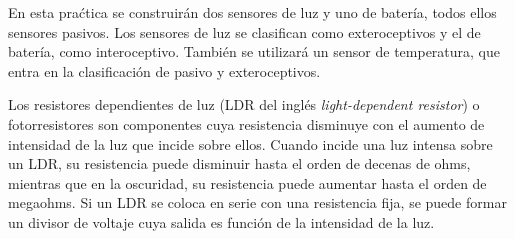 \documentclass[a4paper,12pt]{article}
\begin{document}
En esta praćtica se construirán dos sensores de luz y uno de batería, todos ellos sensores pasivos. Los sensores de luz se clasifican como exteroceptivos y el de batería, como interoceptivo. También se utilizará un sensor de temperatura, que entra en la clasificación de pasivo y exteroceptivos. 

Los resistores dependientes de luz (LDR del inglés \textit{light-dependent resistor}) o fotorresistores son componentes cuya resistencia disminuye con el aumento de intensidad de la luz que incide sobre ellos. Cuando incide una luz intensa sobre un LDR, su resistencia puede disminuir hasta el orden de decenas de ohms, mientras que en la oscuridad, su resistencia puede aumentar hasta el orden de megaohms. Si un LDR se coloca en serie con una resistencia fija, se puede formar un divisor de voltaje cuya salida es función de la intensidad de la luz. 
\end{document}
